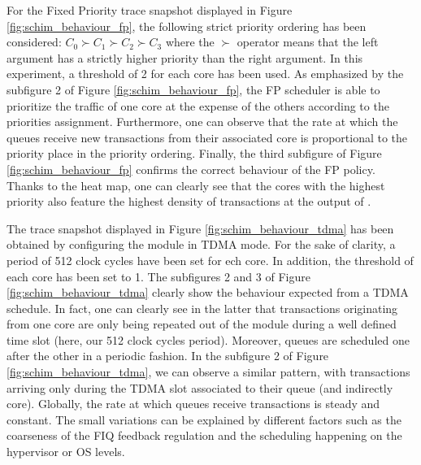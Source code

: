     For the Fixed Priority trace snapshot displayed in Figure \ref{fig:schim_behaviour_fp}, the following strict priority ordering has been considered: $C_{0} \succ C_{1} \succ C_{2} \succ C_{3}$ where the $\succ$ operator means that the left argument has a strictly higher priority than the right argument. In this experiment, a threshold of 2 for each core has been used.
    As emphasized by the subfigure 2 of Figure \ref{fig:schim_behaviour_fp}, the FP scheduler is able to prioritize the traffic of one core at the expense of the others according to the priorities assignment. Furthermore, one can observe that the rate at which the queues receive new transactions from their associated core is proportional to the priority place in the priority ordering.
    Finally, the third subfigure of Figure \ref{fig:schim_behaviour_fp} confirms the correct behaviour of the FP policy. Thanks to the heat map, one can clearly see that the cores with the highest priority also feature the highest density of transactions at the output of \schim.
    
    The trace snapshot displayed in Figure \ref{fig:schim_behaviour_tdma} has been obtained by configuring the \schim module in TDMA mode. For the sake of clarity, a period of 512 clock cycles have been set for ech core. In addition, the threshold of each core has been set to 1.
    The subfigures 2 and 3 of Figure \ref{fig:schim_behaviour_tdma} clearly show the behaviour expected from a TDMA schedule. In fact, one can clearly see in the latter that transactions originating from one core are only being repeated out of the \schim module during a well defined time slot (here, our 512 clock cycles period). Moreover, queues are scheduled one after the other in a periodic fashion.
    In the subfigure 2 of Figure \ref{fig:schim_behaviour_tdma}, we can observe a similar pattern, with transactions arriving only during the TDMA slot associated to their queue (and indirectly core). Globally, the rate at which queues receive transactions is steady and constant. The small variations can be explained by different factors such as the coarseness of the FIQ feedback regulation and the scheduling happening on the hypervisor or OS levels.
    
